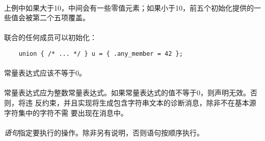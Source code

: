 {\paragraph{}
上例中如果大于10，中间会有一些零值元素；如果小于10，前五个初始化提供的一
些值会被第二个五项覆盖。

\paragraph{}
\ex 联合的任何成员可以初始化：
\begin{lstlisting}
    union { /* ... */ } u = { .any_member = 42 };
\end{lstlisting}


\syntax
\paragraph{}

\constraint
\paragraph{}
常量表达式应该不等于0。

\semantic
\paragraph{}
常量表达式应为整数常量表达式。如果常量表达式的值不等于0，则声明无效。否则，将违
反约束，并且实现将生成包含字符串文本的诊断消息，除非不在基本源字符集中的字符不需
要出现在消息中。


\syntax
\paragraph{}

\semantic
\paragraph{}
\textit{语句}指定要执行的操作。除非另有说明，否则语句按顺序执行。

}
